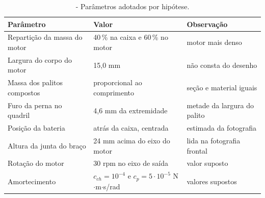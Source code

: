 \begin{table}[H]
\centering
\caption{\label{tab:adotados}- Parâmetros adotados por hipótese.}
\vspace*{.1cm}
\small
\begin{tabular}{|p{5.6cm}|p{4.2cm}|p{4.5cm}|}
\hline
\textbf{Parâmetro} & \textbf{Valor} & \textbf{Observação} \\
\hline
Repartição da massa do motor & 40\,\% na caixa e 60\,\% no motor & motor mais denso \\
\hline
Largura do corpo do motor & 15,0 mm & não consta do desenho \\
\hline
Massa dos palitos compostos & proporcional ao comprimento & seção e material iguais \\
\hline
Furo da perna no quadril & 4,6 mm da extremidade & metade da largura do palito \\
\hline
Posição da bateria & atrás da caixa, centrada & estimada da fotografia \\
\hline
Altura da junta do braço & 24 mm acima do eixo do motor & lida na fotografia frontal \\
\hline
Rotação do motor & 30 rpm no eixo de saída & valor suposto \\
\hline
Amortecimento & $c_{ch}=10^{-4}$ e $c_p=5\cdot10^{-5}$ N$\cdot$m$\cdot$s/rad & valores supostos \\
\hline
\end{tabular}
\end{table}
